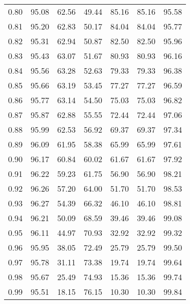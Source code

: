 \begin{tabular}{|c|c|c|c|c|c|c|}
      0.80 &     95.08 &     62.56 &      49.44 &   85.16 &      85.16 &         95.58 \\
      0.81 &     95.20 &     62.83 &      50.17 &   84.04 &      84.04 &         95.77 \\
      0.82 &     95.31 &     62.94 &      50.87 &   82.50 &      82.50 &         95.96 \\
      0.83 &     95.43 &     63.07 &      51.67 &   80.93 &      80.93 &         96.16 \\
      0.84 &     95.56 &     63.28 &      52.63 &   79.33 &      79.33 &         96.38 \\
      0.85 &     95.66 &     63.19 &      53.45 &   77.27 &      77.27 &         96.59 \\
      0.86 &     95.77 &     63.14 &      54.50 &   75.03 &      75.03 &         96.82 \\
      0.87 &     95.87 &     62.88 &      55.55 &   72.44 &      72.44 &         97.06 \\
      0.88 &     95.99 &     62.53 &      56.92 &   69.37 &      69.37 &         97.34 \\
      0.89 &     96.09 &     61.95 &      58.38 &   65.99 &      65.99 &         97.61 \\
      0.90 &     96.17 &     60.84 &      60.02 &   61.67 &      61.67 &         97.92 \\
      0.91 &     96.22 &     59.23 &      61.75 &   56.90 &      56.90 &         98.21 \\
      0.92 &     96.26 &     57.20 &      64.00 &   51.70 &      51.70 &         98.53 \\
      0.93 &     96.27 &     54.39 &      66.32 &   46.10 &      46.10 &         98.81 \\
      0.94 &     96.21 &     50.09 &      68.59 &   39.46 &      39.46 &         99.08 \\
      0.95 &     96.11 &     44.97 &      70.93 &   32.92 &      32.92 &         99.32 \\
      0.96 &     95.95 &     38.05 &      72.49 &   25.79 &      25.79 &         99.50 \\
      0.97 &     95.78 &     31.11 &      73.38 &   19.74 &      19.74 &         99.64 \\
      0.98 &     95.67 &     25.49 &      74.93 &   15.36 &      15.36 &         99.74 \\
      0.99 &     95.51 &     18.15 &      76.15 &   10.30 &      10.30 &         99.84 \\
\bottomrule
\end{tabular}
